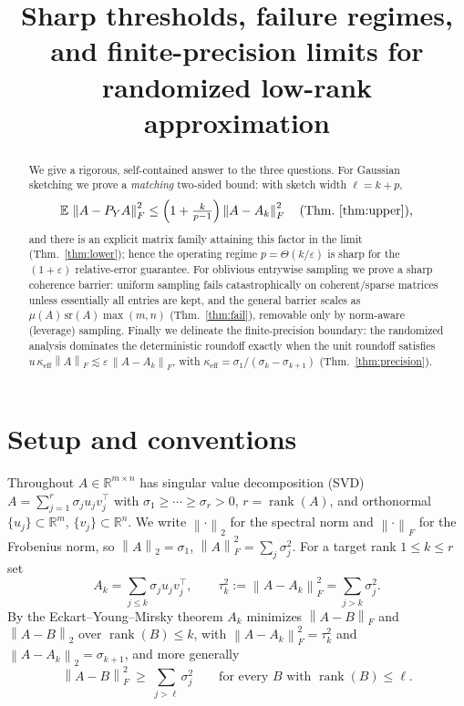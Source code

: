 \documentclass{amsart}
\theoremstyle{definition}
\DeclareMathOperator{\rank}{rank}
\newcommand{\R}{\mathbb{R}}
\newcommand{\Frob}[1]{\left\lVert #1\right\rVert_F}
\newcommand{\Op}[1]{\left\lVert #1\right\rVert_2}
\newcommand{\E}{\mathbb{E}}
\begin{document}
\title{Sharp thresholds, failure regimes, and finite-precision limits for
randomized low-rank approximation}
\maketitle

\begin{abstract}
We give a rigorous, self-contained answer to the three questions. For Gaussian
sketching we prove a \emph{matching} two-sided bound: with sketch width
$\ell=k+p$,
\[
\E\,\Frob{A-P_YA}^2\le\Big(1+\tfrac{k}{p-1}\Big)\Frob{A-A_k}^2
\quad(\text{Thm.~\ref{thm:upper}}),
\]
and there is an explicit matrix family attaining this factor in the limit
(Thm.~\ref{thm:lower}); hence the operating regime $p=\Theta(k/\varepsilon)$ is
sharp for the $(1+\varepsilon)$ relative-error guarantee. For oblivious
entrywise sampling we prove a sharp coherence barrier: uniform sampling fails
catastrophically on coherent/sparse matrices unless essentially all entries are
kept, and the general barrier scales as $\mu(A)\,\mathrm{sr}(A)\max(m,n)$
(Thm.~\ref{thm:fail}), removable only by norm-aware (leverage) sampling. Finally
we delineate the finite-precision boundary: the randomized analysis dominates
the deterministic roundoff exactly when the unit roundoff satisfies
$u\,\kappa_{\mathrm{eff}}\Frob{A}\lesssim\varepsilon\,\Frob{A-A_k}$, with
$\kappa_{\mathrm{eff}}=\sigma_1/(\sigma_k-\sigma_{k+1})$ (Thm.~\ref{thm:precision}).
\end{abstract}

\section{Setup and conventions}\label{sec:setup}

Throughout $A\in\R^{m\times n}$ has singular value decomposition (SVD)
$A=\sum_{j=1}^{r}\sigma_j u_j v_j^{\top}$ with
$\sigma_1\ge\cdots\ge\sigma_r>0$, $r=\rank(A)$, and orthonormal
$\{u_j\}\subset\R^m$, $\{v_j\}\subset\R^n$. We write $\Op{\cdot}$ for the
spectral norm and $\Frob{\cdot}$ for the Frobenius norm, so $\Op{A}=\sigma_1$,
$\Frob{A}^2=\sum_j\sigma_j^2$. For a target rank $1\le k\le r$ set
\begin{equation}\label{eq:partition}
A_k=\sum_{j\le k}\sigma_j u_j v_j^\top,\qquad
\tau_k^2:=\Frob{A-A_k}^2=\sum_{j>k}\sigma_j^2 .
\end{equation}
By the Eckart--Young--Mirsky theorem $A_k$ minimizes $\Frob{A-B}$ and
$\Op{A-B}$ over $\rank(B)\le k$, with $\Frob{A-A_k}^2=\tau_k^2$ and
$\Op{A-A_k}=\sigma_{k+1}$, and more generally
\begin{equation}\label{eq:EY}
\Frob{A-B}^2\ \ge\ \sum_{j>\ell}\sigma_j^2\qquad\text{for every }B\text{ with }\rank(B)\le\ell.
\end{equation}
\end{document}
